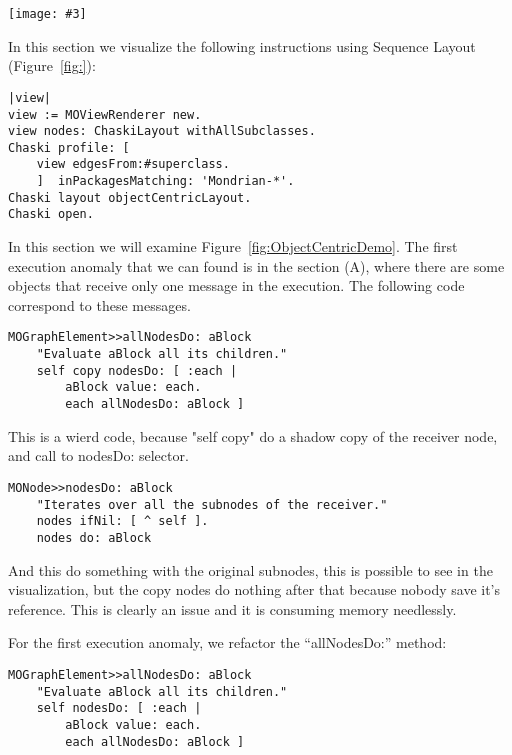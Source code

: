 \documentclass{sig-alternate}
\newcommand{\largefig}[4]{
	\begin{figure*}[#1]
		\centering
		\texttt{[image: \#3]}
		\caption{\label{fig:#3}#4}
	\end{figure*}}
\newcommand{\figref}[1]{Figure~\ref{fig:#1}}
\begin{document}
\largefig{}{1.0}{ObjectCentricDemo}{Sequence Tree Layout}
In this section we visualize the following instructions using Sequence Layout (\figref{}):
\begin{lstlisting}[language=Smalltalk]
|view|
view := MOViewRenderer new.
view nodes: ChaskiLayout withAllSubclasses.
Chaski profile: [
	view edgesFrom:#superclass.
	]  inPackagesMatching: 'Mondrian-*'.
Chaski layout objectCentricLayout.
Chaski open.
\end{lstlisting}

In this section we will examine \figref{ObjectCentricDemo}. The first execution anomaly that we can found is in the section (A), where there are some objects that receive only one message in the execution. The following code correspond to these messages.

\begin{lstlisting}[language=Smalltalk]
MOGraphElement>>allNodesDo: aBlock
	"Evaluate aBlock all its children."
	self copy nodesDo: [ :each |
		aBlock value: each.
		each allNodesDo: aBlock ]
\end{lstlisting} 

This is a wierd code, because "self copy" do a shadow copy of the receiver node, and call to nodesDo: selector.

\begin{lstlisting}[language=Smalltalk]
MONode>>nodesDo: aBlock
	"Iterates over all the subnodes of the receiver."	
	nodes ifNil: [ ^ self ].
	nodes do: aBlock
\end{lstlisting} 

And this do something with the original subnodes, this is possible to see in the visualization, but the copy nodes do nothing after that because nobody save it's reference. This is clearly an issue  and it is consuming memory needlessly.

For the first execution anomaly, we refactor the ``allNodesDo:'' method: 
\begin{lstlisting}[language=Smalltalk]
MOGraphElement>>allNodesDo: aBlock
	"Evaluate aBlock all its children."
	self nodesDo: [ :each |
		aBlock value: each.
		each allNodesDo: aBlock ]
\end{lstlisting} 
\end{document}
